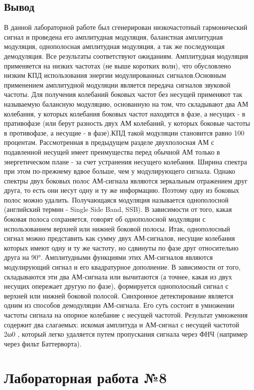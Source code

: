 \documentclass[10pt,a4paper]{report}
\begin{document}
\section{Вывод}
В данной лабораторной работе был сгенерирован низкочастотный гармонический сигнал и проведена его амплитудная модуляция, баланстная амплитудная модуляция, однополосная амплитудная модуляция, а так же последующая демодуляция. Все результаты соответствуют ожиданиям.
Амплитудная модуляция применяется на низких частотах (не выше коротких волн), что обусловлено низким КПД использования энергии модулированных сигналов.Основным применением амплитудной модуляции является передача сигналов звуковой частоты.
Для получения колебаний боковых частот без несущей применяют так называемую балансную модуляцию, основанную на том, что складывают два АМ колебания, у которых колебания боковых частот находятся в фазе, а несущих - в пративофазе (или берут разность двух АМ колебаний, у которых боковые частоты в противофазе, а несущие - в фазе).КПД такой модуляции становится равно 100 процентам.
Рассмотренная в предыдущем разделе двухполосная АМ с подавленной несущей имеет преимущества перед обычной АМ только в энергетическом плане - за счет устранения несущего колебания. Ширина спектра при этом по-прежнему вдвое больше, чем у модулирующего сигнала. Однако спектры двух боковых полос АМ-сигнала являются зеркальным отражением друг друга, то есть они несут одну и ту же информацию. Поэтому одну из боковых полос можно удалить. Получающаяся модуляция называется однополосной (английский термин - Single Side Band, SSB).
В зависимости от того, какая боковая полоса сохраняется, говорят об однополосной модуляции с использованием верхней или нижней боковой полосы.
Итак, однополосный сигнал можно представить как сумму двух АМ-сигналов, несущие колебания которых имеют одну и ту же частоту, но сдвинуты по фазе друг относительно друга на 90°. Амплитудными функциями этих АМ-сигналов являются модулирующий сигнал и его квадратурное дополнение. В зависимости от того, складываются эти два АМ-сигнала или вычитаются (а точнее, какая из двух несущих опережает другую по фазе), формируется однополосный сигнал с верхней или нижней боковой полосой.
Синхронное детектирование является одним из способов демодуляции АМ-сигнала. Его суть состоит в умножении частоты сигнала на опорное колебание с несущей частотой. Результат умножения содержит два слагаемых: искомая амплитуда и АМ-сигнал с несущей частотой 2ω0 , который легко удаляется путем пропускания сигнала через ФНЧ (например через фильт Баттерворта).
\chapter{Лабораторная работа №8}
\end{document}
